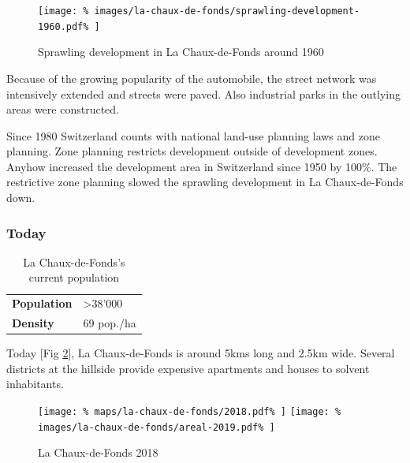 \documentclass{article}
\begin{document}
\begin{multicols}{2}
			\begin{figure}[H]
				\texttt{[image: \%
					images/la-chaux-de-fonds/sprawling-development-1960.pdf\%
				]}
				\caption{Sprawling development in La Chaux-de-Fonds around 1960 \cite{MapGeoAdmin:LaChauxDeFonds}}
				\label{fig:map:la-chaux-de-fonds-sprawling-development-1960}
			\end{figure}
			
			
			
			Because of the growing popularity of the automobile, the street network was intensively extended and streets were paved.
			Also industrial parks in the outlying areas were constructed.
			
			Since 1980 Switzerland counts with national land-use planning laws and zone planning. Zone planning restricts development outside of development zones. Anyhow increased the development area in Switzerland since 1950 by 100\%.
			The restrictive zone planning slowed the sprawling development in La Chaux-de-Fonds down.
			
			
			\subsubsection{Today}			
			
			\begin{table}[H]			
				\centering
				\caption{La Chaux-de-Fonds's current population}
				\label{table:la-chaux-de-fonds-population}
				\begin{tabular}{|l|l|}
					\hline
					\textbf{Population}  & \textgreater 38'000 \\
					\textbf{Density}     & 69 pop./ha \\
					\hline
				\end{tabular}
			\end{table}
			
			Today [Fig \ref{fig:map:la-chaux-de-fonds-2018}], La Chaux-de-Fonds is around 5kms long and 2.5km wide. Several districts at the hillside provide expensive apartments and houses to solvent inhabitants.
			
			\begin{figure}[H]
				\texttt{[image: \%
					maps/la-chaux-de-fonds/2018.pdf\%
				]}
				\texttt{[image: \%
					images/la-chaux-de-fonds/areal-2019.pdf\%
				]}
				\caption{La Chaux-de-Fonds 2018  \cite{MapGeoAdmin:LaChauxDeFonds}}
				\label{fig:map:la-chaux-de-fonds-2018}
			\end{figure}
			

\end{multicols}
\end{document}
